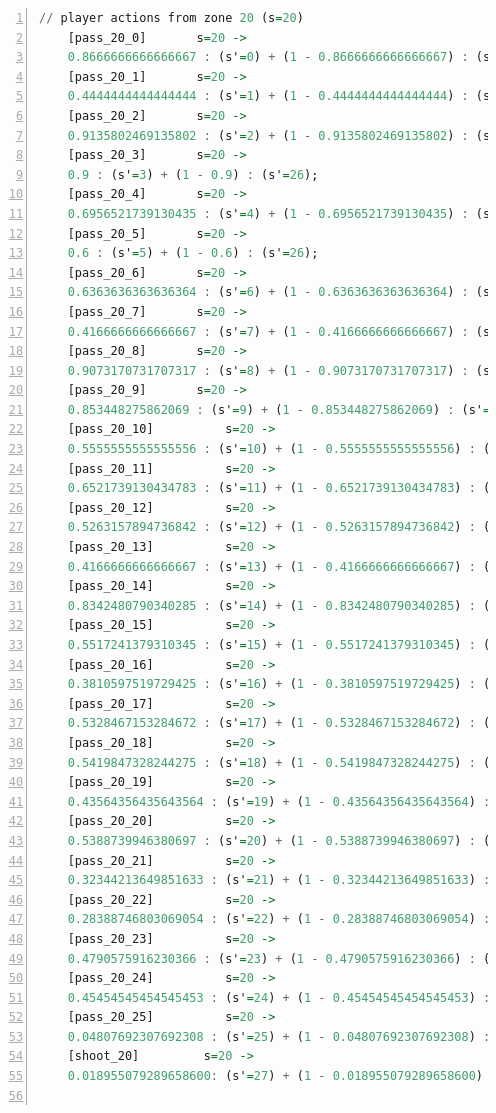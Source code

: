 \documentclass{l4proj}
\begin{document}
\begin{appendices}
\begin{lstlisting}[language=Haskell, numbers=left, caption=MDP used for strategy generation. This is the model specification as-is after the refinements at the end of chapter 3.]
	// player actions from zone 20 (s=20)
	[pass_20_0]	      s=20 ->
	0.8666666666666667 : (s'=0) + (1 - 0.8666666666666667) : (s'=26);
	[pass_20_1]	      s=20 ->
	0.4444444444444444 : (s'=1) + (1 - 0.4444444444444444) : (s'=26);
	[pass_20_2]	      s=20 ->
	0.9135802469135802 : (s'=2) + (1 - 0.9135802469135802) : (s'=26);
	[pass_20_3]	      s=20 ->
	0.9 : (s'=3) + (1 - 0.9) : (s'=26);
	[pass_20_4]	      s=20 ->
	0.6956521739130435 : (s'=4) + (1 - 0.6956521739130435) : (s'=26);
	[pass_20_5]	      s=20 ->
	0.6 : (s'=5) + (1 - 0.6) : (s'=26);
	[pass_20_6]	      s=20 ->
	0.6363636363636364 : (s'=6) + (1 - 0.6363636363636364) : (s'=26);
	[pass_20_7]	      s=20 ->
	0.4166666666666667 : (s'=7) + (1 - 0.4166666666666667) : (s'=26);
	[pass_20_8]	      s=20 ->
	0.9073170731707317 : (s'=8) + (1 - 0.9073170731707317) : (s'=26);
	[pass_20_9]	      s=20 ->
	0.853448275862069 : (s'=9) + (1 - 0.853448275862069) : (s'=26);
	[pass_20_10]	      s=20 ->
	0.5555555555555556 : (s'=10) + (1 - 0.5555555555555556) : (s'=26);
	[pass_20_11]	      s=20 ->
	0.6521739130434783 : (s'=11) + (1 - 0.6521739130434783) : (s'=26);
	[pass_20_12]	      s=20 ->
	0.5263157894736842 : (s'=12) + (1 - 0.5263157894736842) : (s'=26);
	[pass_20_13]	      s=20 ->
	0.4166666666666667 : (s'=13) + (1 - 0.4166666666666667) : (s'=26);
	[pass_20_14]	      s=20 ->
	0.8342480790340285 : (s'=14) + (1 - 0.8342480790340285) : (s'=26);
	[pass_20_15]	      s=20 ->
	0.5517241379310345 : (s'=15) + (1 - 0.5517241379310345) : (s'=26);
	[pass_20_16]	      s=20 ->
	0.3810597519729425 : (s'=16) + (1 - 0.3810597519729425) : (s'=26);
	[pass_20_17]	      s=20 ->
	0.5328467153284672 : (s'=17) + (1 - 0.5328467153284672) : (s'=26);
	[pass_20_18]	      s=20 ->
	0.5419847328244275 : (s'=18) + (1 - 0.5419847328244275) : (s'=26);
	[pass_20_19]	      s=20 ->
	0.43564356435643564 : (s'=19) + (1 - 0.43564356435643564) : (s'=26);
	[pass_20_20]	      s=20 ->
	0.5388739946380697 : (s'=20) + (1 - 0.5388739946380697) : (s'=26);
	[pass_20_21]	      s=20 ->
	0.32344213649851633 : (s'=21) + (1 - 0.32344213649851633) : (s'=26);
	[pass_20_22]	      s=20 ->
	0.28388746803069054 : (s'=22) + (1 - 0.28388746803069054) : (s'=26);
	[pass_20_23]	      s=20 ->
	0.4790575916230366 : (s'=23) + (1 - 0.4790575916230366) : (s'=26);
	[pass_20_24]	      s=20 ->
	0.45454545454545453 : (s'=24) + (1 - 0.45454545454545453) : (s'=26);
	[pass_20_25]	      s=20 ->
	0.04807692307692308 : (s'=25) + (1 - 0.04807692307692308) : (s'=26);
	[shoot_20]	       s=20 ->
	0.018955079289658600: (s'=27) + (1 - 0.018955079289658600) : (s'=26);


\end{lstlisting}
\end{appendices}
\end{document}
